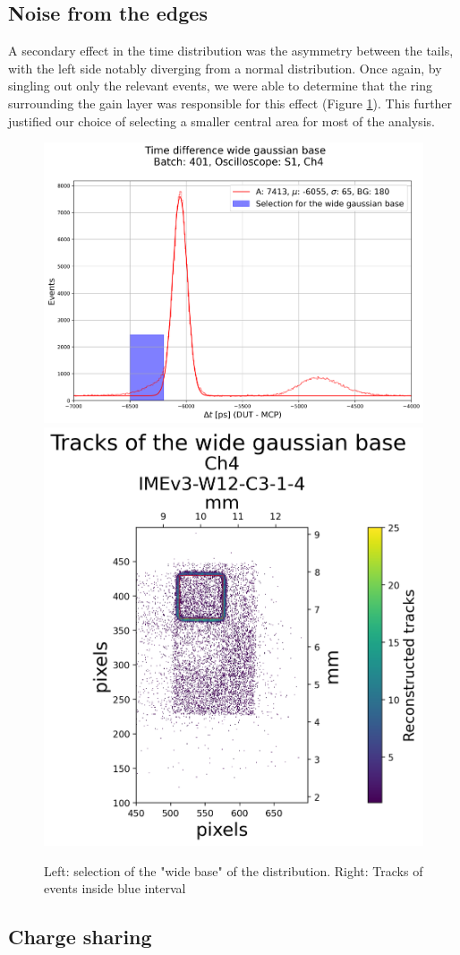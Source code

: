 \subsection{Noise from the edges}\label{sec:deviations_from_gaussian}
A secondary effect in the time distribution was the asymmetry between the tails, with the left side notably diverging from a normal distribution. Once again, by singling out only the relevant events, we were able to determine that the ring surrounding the gain layer was responsible for this effect (Figure \ref{fig:time_difference_wide_gaussian}). This further justified our choice of selecting a smaller central area for most of the analysis.

\begin{figure}[h!tbp]
    \centering
    \includegraphics[width=.55\linewidth]{Images/detailed_analysis/time_difference_401_S1_dut_3_with_wide gaussian_left.png}
    \hfill
    \includegraphics[width=.43\linewidth]{Images/detailed_analysis/2D Tracks 401_S1_dut_3_with_wide_gaussian_base_left.png}
    \captionsetup{width=\captionwidth}
    \caption{Left: selection of the "wide base" of the distribution.
    Right: Tracks of events inside blue interval}
    \label{fig:time_difference_wide_gaussian}
\end{figure}


\subsection{Charge sharing}

